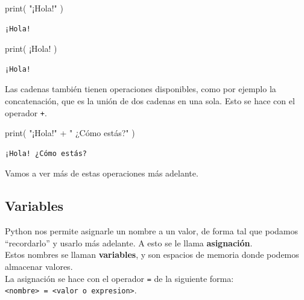 \documentclass[
  letterpaper,
  DIV=11,
  numbers=noendperiod]{scrreprt}
\newenvironment{Shaded}{\begin{snugshade}}{\end{snugshade}}
\newcommand{\BuiltInTok}[1]{\textcolor[rgb]{0.00,0.23,0.31}{#1}}
\newcommand{\NormalTok}[1]{\textcolor[rgb]{0.00,0.23,0.31}{#1}}
\newcommand{\OperatorTok}[1]{\textcolor[rgb]{0.37,0.37,0.37}{#1}}
\newcommand{\StringTok}[1]{\textcolor[rgb]{0.13,0.47,0.30}{#1}}
\begin{document}
\begin{Shaded}
\begin{Highlighting}[]
\BuiltInTok{print}\NormalTok{( }\StringTok{"¡Hola!"}\NormalTok{ )}
\end{Highlighting}
\end{Shaded}

\begin{verbatim}
¡Hola!
\end{verbatim}

\begin{Shaded}
\begin{Highlighting}[]
\BuiltInTok{print}\NormalTok{( }\StringTok{\textquotesingle{}¡Hola!\textquotesingle{}}\NormalTok{ )}
\end{Highlighting}
\end{Shaded}

\begin{verbatim}
¡Hola!
\end{verbatim}

Las cadenas también tienen operaciones disponibles, como por ejemplo la
concatenación, que es la unión de dos cadenas en una sola. Esto se hace
con el operador \texttt{+}.

\begin{Shaded}
\begin{Highlighting}[]
\BuiltInTok{print}\NormalTok{( }\StringTok{"¡Hola!"} \OperatorTok{+} \StringTok{" ¿Cómo estás?"}\NormalTok{ )}
\end{Highlighting}
\end{Shaded}

\begin{verbatim}
¡Hola! ¿Cómo estás?
\end{verbatim}

Vamos a ver más de estas operaciones más adelante.

\subsection{Variables}\label{variables}

Python nos permite asignarle un nombre a un valor, de forma tal que
podamos ``recordarlo'' y usarlo más adelante. A esto se le llama
\textbf{asignación}.\\
Estos nombres se llaman \textbf{variables}, y son espacios de memoria
donde podemos almacenar valores.\\

La asignación se hace con el operador \texttt{=} de la siguiente forma:
\texttt{\textless{}nombre\textgreater{}\ =\ \textless{}valor\ o\ expresion\textgreater{}}.
\end{document}
